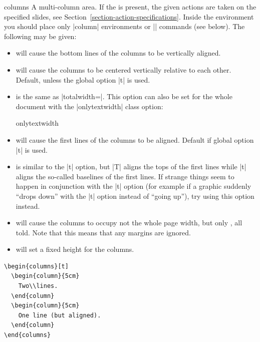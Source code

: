 \begin{environment}{{columns}}
  A multi-column area. If the  is present, the given actions are taken on the specified slides, see Section~\ref{section-action-specifications}. Inside the environment you should place only |column| environments or |\column| commands (see below). The following  may be given:
  \begin{itemize}
  \item
     will cause the bottom lines of the columns to be vertically aligned.
  \item
     will cause the columns to be centered vertically relative to each other. Default, unless the global option |t| is used.
  \item
     is the same as |totalwidth=\textwidth|. This option can also be set for the whole document with the |onlytextwidth| class option:
    \begin{classoption}{onlytextwidth}
    \end{classoption}
  \item
     will cause the first lines of the columns to be aligned. Default if global option |t| is used.
  \item
     is similar to the |t| option, but |T| aligns the tops of the first lines while |t| aligns the so-called baselines of the first lines. If strange things seem to happen in conjunction with the |t| option (for example if a graphic suddenly ``drops down'' with the |t| option instead of ``going up''), try using this option instead.
  \item
     will cause the columns to occupy not the whole page width, but only , all told.
     Note that this means that any margins are ignored.
  \item
     will set a fixed height for the columns.
  \end{itemize}

  \example
\begin{verbatim}
\begin{columns}[t]
  \begin{column}{5cm}
    Two\\lines.
  \end{column}
  \begin{column}{5cm}
    One line (but aligned).
  \end{column}
\end{columns}
\end{verbatim}


\end{environment}
